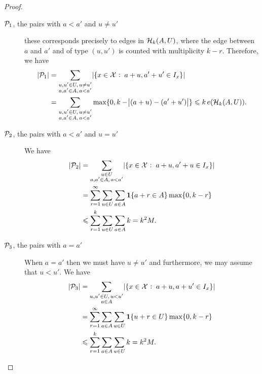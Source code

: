 \documentclass[reqno,a4paper,12pt]{amsart}
\begin{document}
\begin{proof}
    \begin{description}
        \item[$\mathcal{P}_1$, the pairs with $a < a'$ and $u \neq u'$]
            these corresponds precisely to edges in $\mathcal{H}_k(A,U)$, where the edge between $a$ and $a'$ and of type $(u, u')$ is counted with multiplicity $k - r$.
            Therefore, we have
            \begin{align*}
                \lvert\mathcal{P}_1\rvert & = \sum_{\substack{u, u' \in U, \, u \neq u' \\ a, a' \in A, \, a < a'}} \lvert\lbrace x \in \mathcal{X} \mathbin{\colon} a + u, a' + u' \in I_x\rbrace\rvert \\
                             & = \sum_{\substack{u, u' \in U, \, u \neq u' \\ a, a' \in A, \, a < a'}} \max\lbrace0,k-\abs{(a + u) - (a' + u')}\rbrace
                \leqslant k\, e(\mathcal{H}_k(A,U)).
            \end{align*}

        \item[$\mathcal{P}_2$, the pairs with $a < a'$ and $u = u'$]
            We have
            \begin{align*}
                \lvert\mathcal{P}_2\rvert & = \sum_{\substack{u \in U                                                                   \\ a, a' \in A, \, a < a'}} \lvert\lbrace x \in \mathcal{X} \mathbin{\colon} a + u, a' + u \in I_x\rbrace\rvert \\
                             & = \sum_{r = 1}^\infty \sum_{u \in U} \sum_{a \in A} \operatorname{\mathbf{1}}\lbrace a + r \in A\rbrace \max\lbrace0,k - r\rbrace \\
                             & \leqslant \sum_{r = 1}^k \sum_{u \in U} \sum_{a \in A} k = k^2 M.
            \end{align*}

        \item[$\mathcal{P}_3$, the pairs with $a = a'$]
            When $a = a'$ then we must have $u \neq u'$ and furthermore, we may assume that $u < u'$.
            We have
            \begin{align*}
                \lvert\mathcal{P}_3\rvert & = \sum_{\substack{u, u' \in U, \, u < u'                                                    \\ a \in A}} \lvert\lbrace x \in \mathcal{X} \mathbin{\colon} a + u, a + u' \in I_x\rbrace\rvert \\
                             & = \sum_{r = 1}^\infty \sum_{a \in A} \sum_{u \in U} \operatorname{\mathbf{1}}\lbrace u + r \in U\rbrace \max\lbrace0,k - r\rbrace \\
                             & \leqslant \sum_{r = 1}^k \sum_{a \in A} \sum_{u \in U} k = k^2 M.
            \end{align*}
    \end{description}


\end{proof}
\end{document}
